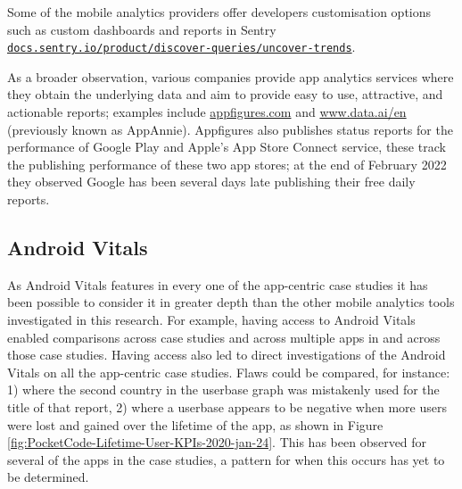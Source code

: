 Some of the mobile analytics providers offer developers customisation options such as custom dashboards and reports in Sentry \href{https://docs.sentry.io/product/discover-queries/uncover-trends/}{\nolinkurl{docs.sentry.io/product/discover-queries/uncover-trends}}.

As a broader observation, various companies provide app analytics services where they obtain the underlying data %
and aim to provide easy to use, attractive, and actionable reports; examples include \href{https://appfigures.com/}{appfigures.com} and \href{https://www.data.ai/en/}{www.data.ai/en} (previously known as AppAnnie). Appfigures also publishes status reports for the performance of Google Play and Apple's App Store Connect service, these track the publishing performance of these two app stores; at the end of February 2022 they observed Google has been several days late publishing their free daily reports. %


\subsection{Android Vitals}
As Android Vitals features in every one of the app-centric case studies it has been possible to consider it in greater depth than the other mobile analytics tools investigated in this research. For example, having access to Android Vitals enabled comparisons across case studies and across multiple apps in and across those case studies. Having access also led to direct investigations of the Android Vitals on all the app-centric case studies. Flaws could be compared, for instance: 1) where the second country in the userbase graph was mistakenly used for the title of that report, 2) where a userbase appears to be negative when more users were lost and gained over the lifetime of the app, as shown in Figure \ref{fig:PocketCode-Lifetime-User-KPIs-2020-jan-24}. This has been observed for several of the apps in the case studies, a pattern for when this occurs has yet to be determined.

